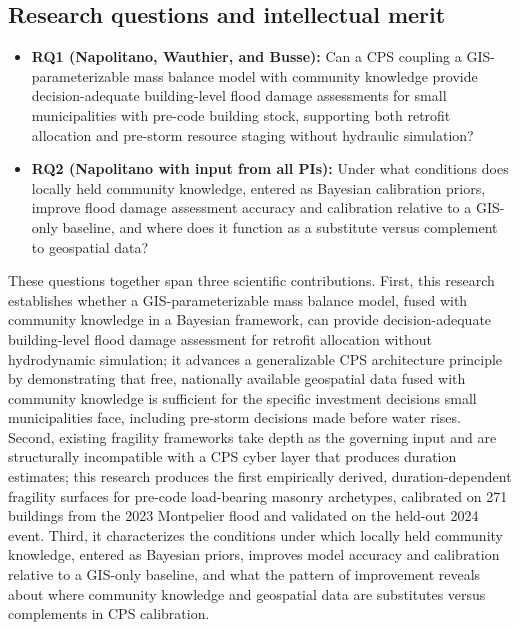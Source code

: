 \documentclass[11pt]{article}
\begin{document}
\vspace{-10pt}
\subsection{Research questions and intellectual merit}

\begin{itemize}[leftmargin=1.5em,itemsep=0pt]
\item \textbf{RQ1 (Napolitano, Wauthier, and Busse):} Can a CPS coupling a
GIS-parameterizable mass balance model with community knowledge provide
decision-adequate building-level flood damage assessments for small municipalities
with pre-code building stock, supporting both retrofit allocation and pre-storm
resource staging without hydraulic simulation?
\item \textbf{RQ2 (Napolitano with input from all PIs):} Under what conditions does locally
held community knowledge, entered as Bayesian calibration priors, improve flood
damage assessment accuracy and calibration relative to a GIS-only baseline, and
where does it function as a substitute versus complement to geospatial data?
\end{itemize}

These questions together span three scientific contributions.
First, this research establishes whether a GIS-parameterizable mass balance model,
fused with community knowledge in a Bayesian framework, can provide decision-adequate
building-level flood damage assessment for retrofit allocation without hydrodynamic
simulation; it advances a generalizable CPS architecture principle by demonstrating
that free, nationally available geospatial data fused with community knowledge is
sufficient for the specific investment decisions small municipalities face, including
pre-storm decisions made before water rises.
Second, existing fragility frameworks take depth as the governing input and are
structurally incompatible with a CPS cyber layer that produces duration estimates;
this research produces the first empirically derived, duration-dependent fragility
surfaces for pre-code load-bearing masonry archetypes, calibrated on 271 buildings
from the 2023 Montpelier flood and validated on the held-out 2024 event.
Third, it characterizes the conditions under which locally held community knowledge,
entered as Bayesian priors, improves model accuracy and calibration relative to a
GIS-only baseline, and what the pattern of improvement reveals about where community
knowledge and geospatial data are substitutes versus complements in CPS calibration.
\end{document}
